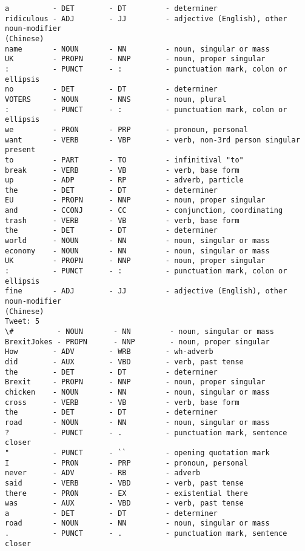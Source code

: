 \begin{Verbatim}[commandchars=\\\{\}]
a          - DET        - DT         - determiner
ridiculous - ADJ        - JJ         - adjective (English), other noun-modifier
(Chinese)
name       - NOUN       - NN         - noun, singular or mass
UK         - PROPN      - NNP        - noun, proper singular
:          - PUNCT      - :          - punctuation mark, colon or ellipsis
no         - DET        - DT         - determiner
VOTERS     - NOUN       - NNS        - noun, plural
:          - PUNCT      - :          - punctuation mark, colon or ellipsis
we         - PRON       - PRP        - pronoun, personal
want       - VERB       - VBP        - verb, non-3rd person singular present
to         - PART       - TO         - infinitival "to"
break      - VERB       - VB         - verb, base form
up         - ADP        - RP         - adverb, particle
the        - DET        - DT         - determiner
EU         - PROPN      - NNP        - noun, proper singular
and        - CCONJ      - CC         - conjunction, coordinating
trash      - VERB       - VB         - verb, base form
the        - DET        - DT         - determiner
world      - NOUN       - NN         - noun, singular or mass
economy    - NOUN       - NN         - noun, singular or mass
UK         - PROPN      - NNP        - noun, proper singular
:          - PUNCT      - :          - punctuation mark, colon or ellipsis
fine       - ADJ        - JJ         - adjective (English), other noun-modifier
(Chinese)
Tweet: 5
\#          - NOUN       - NN         - noun, singular or mass
BrexitJokes - PROPN      - NNP        - noun, proper singular
How        - ADV        - WRB        - wh-adverb
did        - AUX        - VBD        - verb, past tense
the        - DET        - DT         - determiner
Brexit     - PROPN      - NNP        - noun, proper singular
chicken    - NOUN       - NN         - noun, singular or mass
cross      - VERB       - VB         - verb, base form
the        - DET        - DT         - determiner
road       - NOUN       - NN         - noun, singular or mass
?          - PUNCT      - .          - punctuation mark, sentence closer
"          - PUNCT      - ``         - opening quotation mark
I          - PRON       - PRP        - pronoun, personal
never      - ADV        - RB         - adverb
said       - VERB       - VBD        - verb, past tense
there      - PRON       - EX         - existential there
was        - AUX        - VBD        - verb, past tense
a          - DET        - DT         - determiner
road       - NOUN       - NN         - noun, singular or mass
.          - PUNCT      - .          - punctuation mark, sentence closer

\end{Verbatim}
